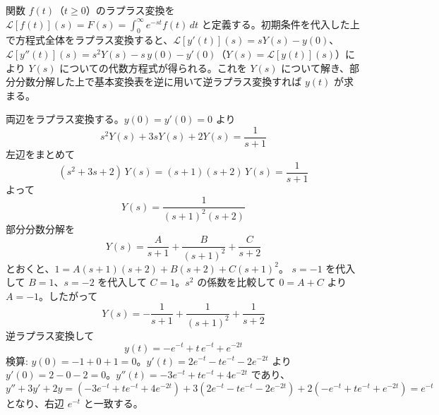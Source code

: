
関数 $f(t)$（$t \ge 0$）のラプラス変換を $\mathcal{L}[f(t)](s) = F(s) = \displaystyle\int_{0}^{\infty} e^{-st} f(t)\,dt$ と定義する。初期条件を代入した上で方程式全体をラプラス変換すると、$\mathcal{L}[y'(t)](s) = sY(s) - y(0)$、$\mathcal{L}[y''(t)](s) = s^{2}Y(s) - s\,y(0) - y'(0)$（$Y(s) = \mathcal{L}[y(t)](s)$）により $Y(s)$ についての代数方程式が得られる。これを $Y(s)$ について解き、部分分数分解した上で基本変換表を逆に用いて逆ラプラス変換すれば $y(t)$ が求まる。

両辺をラプラス変換する。$y(0)=y'(0)=0$ より
\[
s^{2}Y(s) + 3sY(s) + 2Y(s) = \frac{1}{s+1}
\]
左辺をまとめて
\[
(s^{2}+3s+2)\,Y(s) = (s+1)(s+2)\,Y(s) = \frac{1}{s+1}
\]
よって
\[
Y(s) = \frac{1}{(s+1)^{2}(s+2)}
\]
部分分数分解を
\[
Y(s) = \frac{A}{s+1} + \frac{B}{(s+1)^{2}} + \frac{C}{s+2}
\]
とおくと、$1 = A(s+1)(s+2) + B(s+2) + C(s+1)^{2}$。
$s=-1$ を代入して $B=1$、$s=-2$ を代入して $C=1$。$s^{2}$ の係数を比較して $0 = A+C$ より $A=-1$。したがって
\[
Y(s) = -\frac{1}{s+1} + \frac{1}{(s+1)^{2}} + \frac{1}{s+2}
\]
逆ラプラス変換して
\[
\boxed{\; y(t) = -e^{-t} + t\,e^{-t} + e^{-2t} \;}
\]
検算: $y(0) = -1+0+1=0$。$y'(t) = 2e^{-t} - t e^{-t} - 2e^{-2t}$ より $y'(0) = 2-0-2=0$。$y''(t) = -3e^{-t}+t e^{-t}+4e^{-2t}$ であり、
\[
y''+3y'+2y = (-3e^{-t}+te^{-t}+4e^{-2t}) + 3(2e^{-t}-te^{-t}-2e^{-2t}) + 2(-e^{-t}+te^{-t}+e^{-2t}) = e^{-t}
\]
となり、右辺 $e^{-t}$ と一致する。
